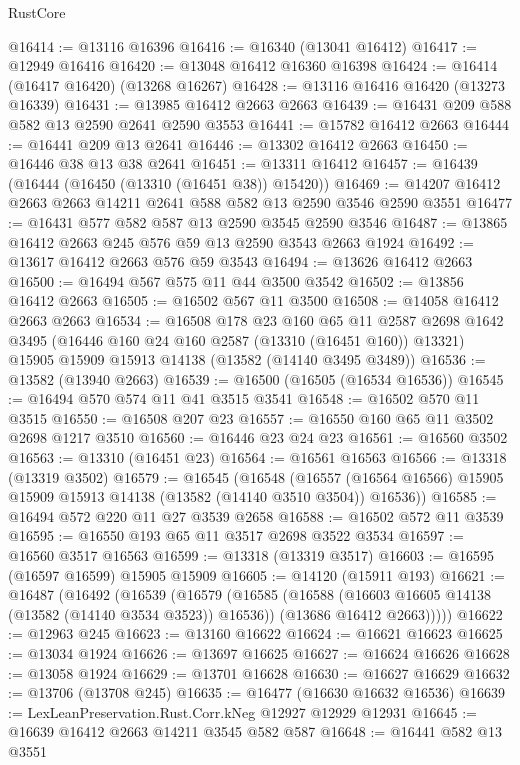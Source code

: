 \begin{lexlean}{RustCore}
\begin{coremodule}
@16414 := @13116 @16396
@16416 := @16340 (@13041 @16412)
@16417 := @12949 @16416
@16420 := @13048 @16412 @16360 @16398
@16424 := @16414 (@16417 @16420) (@13268 @16267)
@16428 := @13116 @16416 @16420 (@13273 @16339)
@16431 := @13985 @16412 @2663 @2663
@16439 := @16431 @209 @588 @582 @13 @2590 @2641 @2590 @3553
@16441 := @15782 @16412 @2663
@16444 := @16441 @209 @13 @2641
@16446 := @13302 @16412 @2663
@16450 := @16446 @38 @13 @38 @2641
@16451 := @13311 @16412
@16457 := @16439 (@16444 (@16450 (@13310 (@16451 @38)) @15420))
@16469 := @14207 @16412 @2663 @2663 @14211 @2641 @588 @582 @13 @2590 @3546 @2590 @3551
@16477 := @16431 @577 @582 @587 @13 @2590 @3545 @2590 @3546
@16487 := @13865 @16412 @2663 @245 @576 @59 @13 @2590 @3543 @2663 @1924
@16492 := @13617 @16412 @2663 @576 @59 @3543
@16494 := @13626 @16412 @2663
@16500 := @16494 @567 @575 @11 @44 @3500 @3542
@16502 := @13856 @16412 @2663
@16505 := @16502 @567 @11 @3500
@16508 := @14058 @16412 @2663 @2663
@16534 := @16508
    @178
    @23
    @160
    @65
    @11
    @2587
    @2698
    @1642
    @3495
    (@16446 @160 @24 @160 @2587 (@13310 (@16451 @160)) @13321)
    @15905
    @15909
    @15913
    @14138
    (@13582 (@14140 @3495 @3489))
@16536 := @13582 (@13940 @2663)
@16539 := @16500 (@16505 (@16534 @16536))
@16545 := @16494 @570 @574 @11 @41 @3515 @3541
@16548 := @16502 @570 @11 @3515
@16550 := @16508 @207 @23
@16557 := @16550 @160 @65 @11 @3502 @2698 @1217 @3510
@16560 := @16446 @23 @24 @23
@16561 := @16560 @3502
@16563 := @13310 (@16451 @23)
@16564 := @16561 @16563
@16566 := @13318 (@13319 @3502)
@16579 := @16545
    (@16548
      (@16557 (@16564 @16566) @15905 @15909 @15913 @14138 (@13582 (@14140 @3510 @3504)) @16536))
@16585 := @16494 @572 @220 @11 @27 @3539 @2658
@16588 := @16502 @572 @11 @3539
@16595 := @16550 @193 @65 @11 @3517 @2698 @3522 @3534
@16597 := @16560 @3517 @16563
@16599 := @13318 (@13319 @3517)
@16603 := @16595 (@16597 @16599) @15905 @15909
@16605 := @14120 (@15911 @193)
@16621 := @16487
    (@16492
      (@16539
        (@16579
          (@16585
            (@16588 (@16603 @16605 @14138 (@13582 (@14140 @3534 @3523)) @16536))
            (@13686 @16412 @2663)))))
@16622 := @12963 @245
@16623 := @13160 @16622
@16624 := @16621 @16623
@16625 := @13034 @1924
@16626 := @13697 @16625
@16627 := @16624 @16626
@16628 := @13058 @1924
@16629 := @13701 @16628
@16630 := @16627 @16629
@16632 := @13706 (@13708 @245)
@16635 := @16477 (@16630 @16632 @16536)
@16639 := LexLeanPreservation.Rust.Corr.kNeg @12927 @12929 @12931
@16645 := @16639 @16412 @2663 @14211 @3545 @582 @587
@16648 := @16441 @582 @13 @3551

\end{coremodule}
\end{lexlean}
